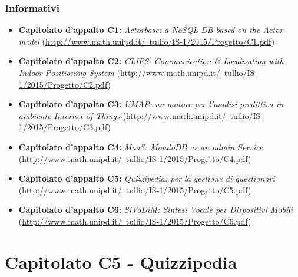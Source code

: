 \documentclass[a4paper, titlepage]{article}
\begin{document}
\subsubsection{Informativi}
\begin{itemize}
	\item \textbf{Capitolato d'appalto C1:} \textit{Actorbase: a NoSQL DB based on the Actor model} (\href{http://www.math.unipd.it/~tullio/IS-1/2015/Progetto/C1.pdf}{http://www.math.unipd.it/~tullio/IS-1/2015/Progetto/C1.pdf})
	
	\item \textbf{Capitolato d'appalto C2:} \textit{CLIPS: Communication \& Localisation with Indoor Positioning System} (\href{http://www.math.unipd.it/~tullio/IS-1/2015/Progetto/C2.pdf}{http://www.math.unipd.it/~tullio/IS-1/2015/Progetto/C2.pdf})
	
	\item \textbf{Capitolato d'appalto C3:} \textit{UMAP: un motore per l'analisi predittiva in ambiente Internet of Things}
	(\href{http://www.math.unipd.it/~tullio/IS-1/2015/Progetto/C3.pdf}{http://www.math.unipd.it/~tullio/IS-1/2015/Progetto/C3.pdf})
	
	\item \textbf{Capitolato d'appalto C4:} \textit{MaaS: MondoDB as an admin Service} (\href{http://www.math.unipd.it/~tullio/IS-1/2015/Progetto/C4.pdf}{http://www.math.unipd.it/~tullio/IS-1/2015/Progetto/C4.pdf})
	
	\item \textbf{Capitolato d'appalto C5:} \textit{Quizzipedia:  per la gestione di questionari} (\href{http://www.math.unipd.it/~tullio/IS-1/2015/Progetto/C5.pdf}{http://www.math.unipd.it/~tullio/IS-1/2015/Progetto/C5.pdf})
	
	\item \textbf{Capitolato d'appalto C6:} \textit{SiVoDiM: Sintesi Vocale per Dispositivi Mobili} (\href{http://www.math.unipd.it/~tullio/IS-1/2015/Progetto/C6.pdf}{http://www.math.unipd.it/~tullio/IS-1/2015/Progetto/C6.pdf})
\end{itemize}

\newpage

\section{Capitolato C5 - Quizzipedia}
\end{document}
